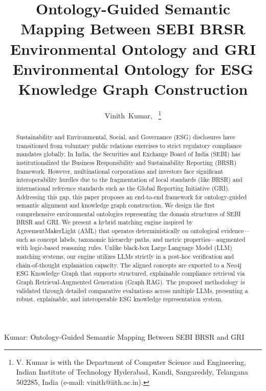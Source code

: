 \documentclass[journal,compsoc]{IEEEtran}
\begin{document}
\title{Ontology-Guided Semantic Mapping Between SEBI BRSR Environmental Ontology and GRI Environmental Ontology for ESG Knowledge Graph Construction}

\author{Vinith~Kumar,~
\thanks{V. Kumar is with the Department of Computer Science and Engineering, Indian Institute of Technology Hyderabad, Kandi, Sangareddy, Telangana 502285, India (e-mail: vinith@iith.ac.in).}}

%
{Kumar: Ontology-Guided Semantic Mapping Between SEBI BRSR and GRI}

\maketitle

\begin{abstract}
Sustainability and Environmental, Social, and Governance (ESG) disclosures have transitioned from voluntary public relations exercises to strict regulatory compliance mandates globally. In India, the Securities and Exchange Board of India (SEBI) has institutionalized the Business Responsibility and Sustainability Reporting (BRSR) framework. However, multinational corporations and investors face significant interoperability hurdles due to the fragmentation of local standards (like BRSR) and international reference standards such as the Global Reporting Initiative (GRI). Addressing this gap, this paper proposes an end-to-end framework for ontology-guided semantic alignment and knowledge graph construction. We design the first comprehensive environmental ontologies representing the domain structures of SEBI BRSR and GRI. We present a hybrid matching engine inspired by AgreementMakerLight (AML) that operates deterministically on ontological evidence—such as concept labels, taxonomic hierarchy paths, and metric properties—augmented with logic-based reasoning rules. Unlike black-box Large Language Model (LLM) matching systems, our engine utilizes LLMs strictly in a post-hoc verification and chain-of-thought explanation capacity. The aligned concepts are exported to a Neo4j ESG Knowledge Graph that supports structured, explainable compliance retrieval via Graph Retrieval-Augmented Generation (Graph RAG). The proposed methodology is validated through detailed comparative evaluations across multiple LLMs, presenting a robust, explainable, and interoperable ESG knowledge representation system.
\end{abstract}
\end{document}
